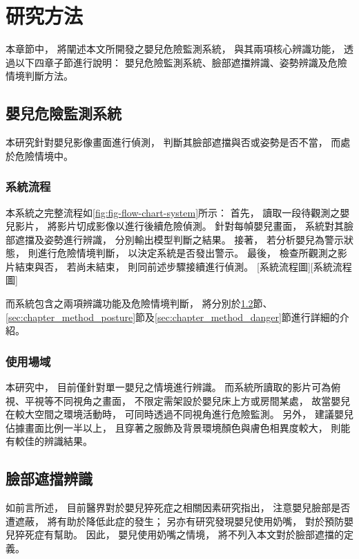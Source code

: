 \documentclass[class=NCU_thesis, crop=false]{standalone}
\begin{document}
\chapter{研究方法}
本章節中，
將闡述本文所開發之嬰兒危險監測系統，
與其兩項核心辨識功能，
透過以下四章子節進行說明：
嬰兒危險監測系統、臉部遮擋辨識、姿勢辨識及危險情境判斷方法。

\section{嬰兒危險監測系統}
本研究針對嬰兒影像畫面進行偵測，
判斷其臉部遮擋與否或姿勢是否不當，
而處於危險情境中。

\subsection{系統流程}
本系統之完整流程如\cref{fig:fig-flow-chart-system}所示：
首先，
讀取一段待觀測之嬰兒影片，
將影片切成影像以進行後續危險偵測。
針對每幀嬰兒畫面，
系統對其臉部遮擋及姿勢進行辨識，
分別輸出模型判斷之結果。
接著，
若分析嬰兒為警示狀態，
則進行危險情境判斷，
以決定系統是否發出警示。
最後，
檢查所觀測之影片結束與否，
若尚未結束，
則同前述步驟接續進行偵測。
[系統流程圖][系統流程圖]

而系統包含之兩項辨識功能及危險情境判斷，
將分別於\ref{sec:chapter_method_face}節、\ref{sec:chapter_method_posture}節及\ref{sec:chapter_method_danger}節進行詳細的介紹。


\subsection{使用場域}
本研究中，
目前僅針對單一嬰兒之情境進行辨識。
而系統所讀取的影片可為俯視、平視等不同視角之畫面，
不限定需架設於嬰兒床上方或房間某處，
故當嬰兒在較大空間之環境活動時，
可同時透過不同視角進行危險監測。
另外，
建議嬰兒佔據畫面比例一半以上，
且穿著之服飾及背景環境顏色與膚色相異度較大，
則能有較佳的辨識結果。

\section{臉部遮擋辨識}
\label{sec:chapter_method_face}
如前言所述，
目前醫界對於嬰兒猝死症之相關因素研究指出，
注意嬰兒臉部是否遭遮蔽，
將有助於降低此症的發生；
另亦有研究發現嬰兒使用奶嘴，
對於預防嬰兒猝死症有幫助。
因此，
嬰兒使用奶嘴之情境，
將不列入本文對於臉部遮擋的定義。
\end{document}
